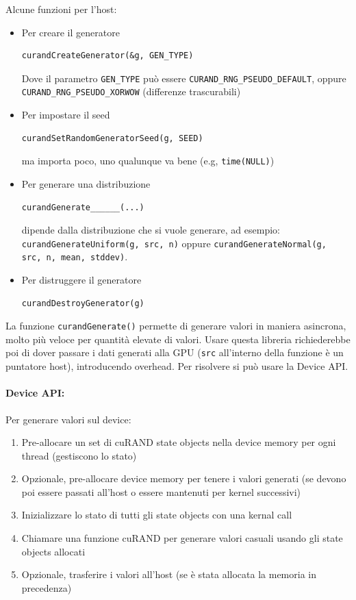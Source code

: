 Alcune funzioni per l'host: 
\begin{itemize}
	\item Per creare il generatore
	\begin{lstlisting}
curandCreateGenerator(&g, GEN_TYPE)
	\end{lstlisting}
	Dove il parametro \texttt{GEN\_TYPE} può essere \texttt{CURAND\_RNG\_PSEUDO\_DEFAULT}, oppure \texttt{CURAND\_RNG\_PSEUDO\_XORWOW} (differenze trascurabili)
	
	\item Per impostare il seed
	\begin{lstlisting}
curandSetRandomGeneratorSeed(g, SEED)
	\end{lstlisting}
	ma importa poco, uno qualunque va bene (e.g, \texttt{time(NULL)})
	
	\item Per generare una distribuzione
	\begin{lstlisting}
curandGenerate______(...)
	\end{lstlisting}
	dipende dalla distribuzione che si vuole generare, ad esempio: \texttt{curandGenerateUniform(g, src, n)} oppure \texttt{curandGenerateNormal(g, src, n, mean, stddev)}. 

	\item Per distruggere il generatore
	\begin{lstlisting}
curandDestroyGenerator(g)
	\end{lstlisting}
\end{itemize}

La funzione \texttt{curandGenerate()} permette di generare valori in maniera asincrona, molto più veloce per quantità elevate di valori. Usare questa libreria richiederebbe poi di dover passare i dati generati alla GPU (\texttt{src} all'interno della funzione è un puntatore host), introducendo overhead. Per risolvere si può usare la Device API.

\paragraph{Device API:} Per generare valori sul device: 
\begin{enumerate}
	\item Pre-allocare un set di cuRAND state objects nella device memory per ogni thread (gestiscono lo stato)

	\item Opzionale, pre-allocare device memory per tenere i valori generati (se devono poi essere passati all'host o essere mantenuti per kernel successivi)

	\item Inizializzare lo stato di tutti gli state objects con una kernal call

	\item Chiamare una funzione cuRAND per generare valori casuali usando gli state objects allocati

	\item Opzionale, trasferire i valori all'host (se è stata allocata la memoria in precedenza)
\end{enumerate}

